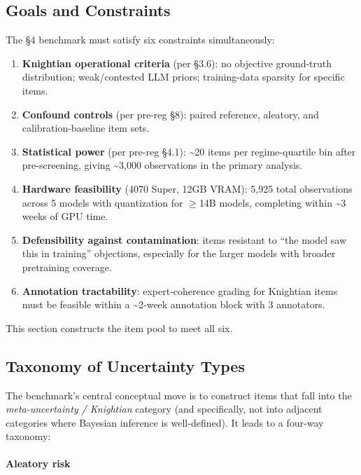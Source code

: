 \documentclass{article}
\providecommand{\tightlist}{\setlength{\itemsep}{0pt}\setlength{\parskip}{0pt}}
\begin{document}
\subsection{Goals and Constraints}\label{goals-and-constraints}

The \S{}4 benchmark must satisfy six constraints simultaneously:

\begin{enumerate}
\def\labelenumi{\arabic{enumi}.}
\tightlist
\item
  \textbf{Knightian operational criteria} (per \S{}3.6): no objective
  ground-truth distribution; weak/contested LLM priors; training-data
  sparsity for specific items.
\item
  \textbf{Confound controls} (per pre-reg \S{}8): paired reference,
  aleatory, and calibration-baseline item sets.
\item
  \textbf{Statistical power} (per pre-reg \S{}4.1): \textasciitilde20 items
  per regime-quartile bin after pre-screening, giving
  \textasciitilde3,000 observations in the primary analysis.
\item
  \textbf{Hardware feasibility} (4070 Super, 12GB VRAM): 5,925 total
  observations across 5 models with quantization for \ensuremath{\geq}14B models,
  completing within \textasciitilde3 weeks of GPU time.
\item
  \textbf{Defensibility against contamination}: items resistant to ``the
  model saw this in training'' objections, especially for the larger
  models with broader pretraining coverage.
\item
  \textbf{Annotation tractability}: expert-coherence grading for
  Knightian items must be feasible within a \textasciitilde2-week
  annotation block with 3 annotators.
\end{enumerate}

This section constructs the item pool to meet all six.

\subsection{Taxonomy of Uncertainty
Types}\label{taxonomy-of-uncertainty-types}

The benchmark's central conceptual move is to construct items that fall
into the \emph{meta-uncertainty / Knightian} category (and specifically,
not into adjacent categories where Bayesian inference is well-defined).
It leads to a four-way taxonomy:

\paragraph{Aleatory risk}\label{aleatory-risk}
\end{document}
